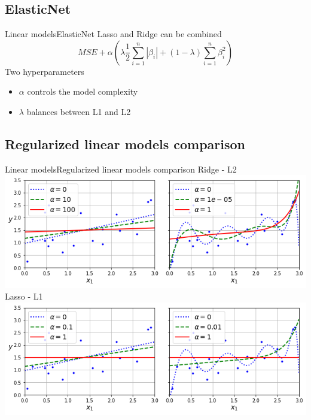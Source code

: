 \documentclass[10pt,compress]{beamer} %
\begin{document}
\subsection{ElasticNet}
\begin{frame}{Linear models}{ElasticNet}
	Lasso and Ridge can be combined
    \begin{equation*}
        MSE + \alpha \left( \lambda \frac{1}{2} \sum_{i=1}^n |\beta_i| + (1-\lambda) \sum_{i=1}^n \beta_i^2 \right)
    \end{equation*}
    Two hyperparameters
	\begin{itemize}
        \item $\alpha$ controls the model complexity
		\item $\lambda$ balances between L1 and L2
	\end{itemize}
\end{frame}

\subsection{Regularized linear models comparison}
\begin{frame}{Linear models}{Regularized linear models comparison}
    \centering
    Ridge - L2\\
    \centering \includegraphics[width=0.7\linewidth]{figs/ridge.png}\\
    Lasso - L1\\
    \centering \includegraphics[width=0.7\linewidth]{figs/lasso.png}
\end{frame}
\end{document}

